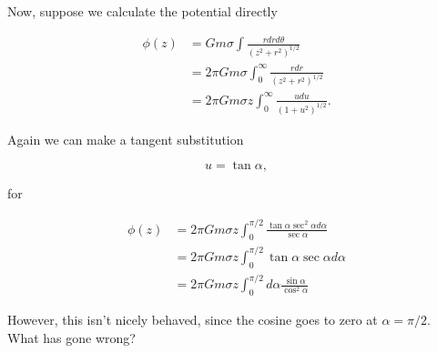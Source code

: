 Now, suppose we calculate the potential directly

\begin{align*}
\phi(z)
&= G m \sigma \int \frac{r dr d\theta}{(z^2 + r^2)^{1/2}} \\
&= 2 \pi G m \sigma \int_0^\infty \frac{r dr }{(z^2 + r^2)^{1/2}} \\
&= 2 \pi G m \sigma z \int_0^\infty \frac{u du }{(1 + u^2)^{1/2}}.
\end{align*}

Again we can make a tangent substitution 

\begin{equation}\label{eqn:classicalMechanicsPs2:n}
u = \tan\alpha,
\end{equation}

for

\begin{align*}
\phi(z)
&= 2 \pi G m \sigma z \int_0^{\pi/2} \frac{\tan \alpha \sec^2 \alpha d \alpha }{\sec\alpha} \\
&= 2 \pi G m \sigma z \int_0^{\pi/2} \tan \alpha \sec \alpha d \alpha \\
&= 2 \pi G m \sigma z \int_0^{\pi/2} d\alpha \frac{\sin \alpha}{\cos^2 \alpha}
\end{align*}

However, this isn't nicely behaved, since the cosine goes to zero at $\alpha = \pi/2$.  What has gone wrong?

\EndNoBibArticle
